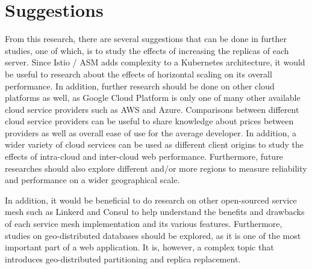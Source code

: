 \section{Suggestions}
\label{sec:saran}

From this research, there are several suggestions that can be done in further studies, one of which, is to study the effects of increasing the replicas of each server. Since Istio / ASM adds complexity to a Kubernetes architecture, it would be useful to research about the effects of horizontal scaling on its overall performance. In addition, further research should be done on other cloud platforms as well, as Google Cloud Platform is only one of many other available cloud service providers such as AWS and Azure. Comparisons between different cloud service providers can be useful to share knowledge about prices between providers as well as overall ease of use for the average developer. In addition, a wider variety of cloud services can be used as different client origins to study the effects of intra-cloud and inter-cloud web performance. Furthermore, future researches should also explore different and/or more regions to measure reliability and performance on a wider geographical scale.

In addition, it would be beneficial to do research on other open-sourced service mesh such as Linkerd and Consul to help understand the benefits and drawbacks of each service mesh implementation and its various features. Furthermore, studies on geo-distributed databases should be explored, as it is one of the most important part of a web application. It is, however, a complex topic that introduces geo-distributed partitioning and replica replacement.

